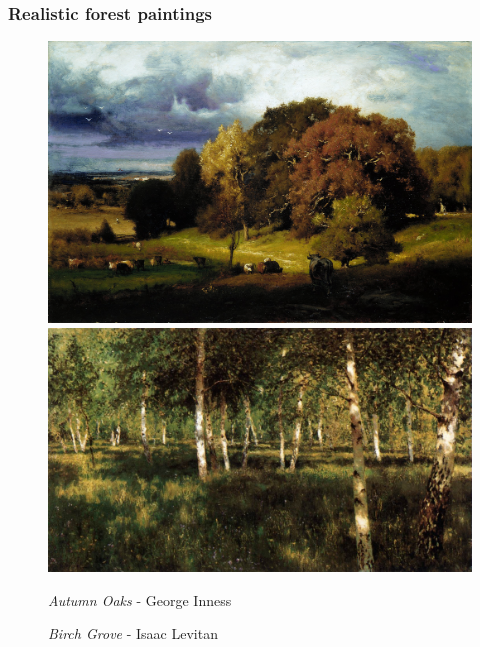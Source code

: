 \documentclass[a4paper]{article}
\begin{document}
\subsubsection{Realistic forest paintings}
\begin {figure}[h!]
\centering
\begin{minipage}[b]{.49\textwidth}
	\centering
	\includegraphics[width=\textwidth]{ForestPaintings/R1innessautumnoaks.jpg}
\end{minipage}
\hfill
\begin{minipage}[b]{.49\textwidth}
	\centering
	\includegraphics[width=\textwidth]{ForestPaintings/R2levitanbirchgrove.jpg}
\end{minipage}
\begin{minipage}[b]{.49\textwidth}
    \caption{\emph{Autumn Oaks} - George Inness}
\end{minipage}
\begin{minipage}[b]{.49\textwidth}
    \caption{\emph{Birch Grove} - Isaac Levitan}
\end{minipage}
\end{figure}
\end{document}
